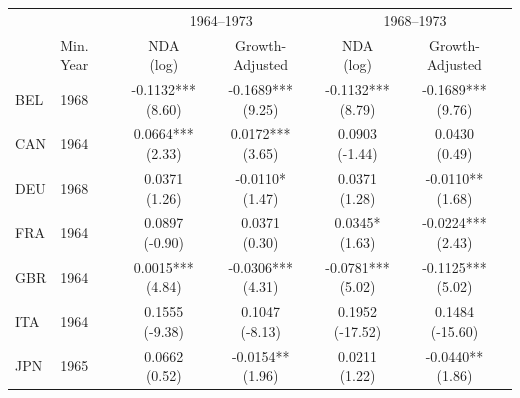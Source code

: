 \begin{tabular}{llcccc}
\toprule
 & & \multicolumn{2}{c}{1964--1973} & \multicolumn{2}{c}{1968--1973} \\
 & Min. Year & NDA (log) & Growth-Adjusted & NDA (log) & Growth-Adjusted \\
\midrule
 BEL & 1968 & \makecell{-0.1132*** \\ (8.60)} & \makecell{-0.1689*** \\ (9.25)} & \makecell{-0.1132*** \\ (8.79)} & \makecell{-0.1689*** \\ (9.76)} \\ 
 CAN & 1964 & \makecell{0.0664*** \\ (2.33)} & \makecell{0.0172*** \\ (3.65)} & \makecell{0.0903 \\ (-1.44)} & \makecell{0.0430 \\ (0.49)} \\ 
 DEU & 1968 & \makecell{0.0371 \\ (1.26)} & \makecell{-0.0110* \\ (1.47)} & \makecell{0.0371 \\ (1.28)} & \makecell{-0.0110** \\ (1.68)} \\ 
 FRA & 1964 & \makecell{0.0897 \\ (-0.90)} & \makecell{0.0371 \\ (0.30)} & \makecell{0.0345* \\ (1.63)} & \makecell{-0.0224*** \\ (2.43)} \\ 
 GBR & 1964 & \makecell{0.0015*** \\ (4.84)} & \makecell{-0.0306*** \\ (4.31)} & \makecell{-0.0781*** \\ (5.02)} & \makecell{-0.1125*** \\ (5.02)} \\ 
 ITA & 1964 & \makecell{0.1555 \\ (-9.38)} & \makecell{0.1047 \\ (-8.13)} & \makecell{0.1952 \\ (-17.52)} & \makecell{0.1484 \\ (-15.60)} \\ 
 JPN & 1965 & \makecell{0.0662 \\ (0.52)} & \makecell{-0.0154** \\ (1.96)} & \makecell{0.0211 \\ (1.22)} & \makecell{-0.0440** \\ (1.86)} \\ 

\end{tabular}
